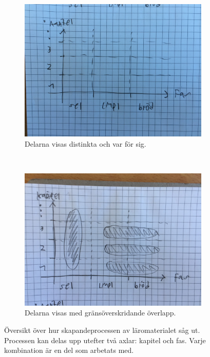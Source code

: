 \begin{binge}
\begin{figure}[tph]
    \centering
    \begin{subfigure}[t]{0.5\textwidth}
        \centering
        \includegraphics[width=0.9\linewidth]{figure/oversiktA.jpg}
        \caption{Delarna visas distinkta och var för sig.}
        \label{fig:oversiktA}
    \end{subfigure}%
    ~ 
    \begin{subfigure}[t]{0.5\textwidth}
        \centering
        \includegraphics[width=0.9\linewidth]{figure/oversiktB.jpg}
        \caption{Delarna visas med gränsöverskridande överlapp.}
        \label{fig:oversiktB}
    \end{subfigure}
    \caption{Översikt över hur skapandeprocessen av läromaterialet såg ut. Processen kan delas upp utefter två axlar: kapitel och fas. Varje kombination är en del som arbetats med.}
\end{figure}


\end{binge}
